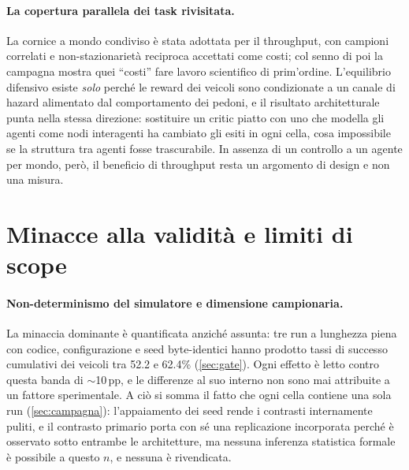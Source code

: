 \paragraph{La copertura parallela dei task rivisitata.}
La cornice a mondo condiviso è stata adottata per il throughput, con
campioni correlati e non-stazionarietà reciproca accettati come costi;
col senno di poi la campagna mostra quei ``costi'' fare lavoro
scientifico di prim'ordine. L'equilibrio difensivo esiste \emph{solo}
perché le reward dei veicoli sono condizionate a un canale di hazard
alimentato dal comportamento dei pedoni, e il risultato architetturale
punta nella stessa direzione: sostituire un critic piatto con uno che
modella gli agenti come nodi interagenti ha cambiato gli esiti in ogni
cella, cosa impossibile se la struttura tra agenti fosse trascurabile.
In assenza di un controllo a un agente per mondo, però, il beneficio di
throughput resta un argomento di design e non una misura.

\section{Minacce alla validità e limiti di scope}
\label{sec:minacce}

\paragraph{Non-determinismo del simulatore e dimensione campionaria.}
La minaccia dominante è quantificata anziché assunta: tre run a
lunghezza piena con codice, configurazione e seed byte-identici hanno
prodotto tassi di successo cumulativi dei veicoli tra 52.2 e 62.4\%
(\cref{sec:gate}). Ogni effetto è letto contro questa banda di
$\sim$10\,pp, e le differenze al suo interno non sono mai attribuite a
un fattore sperimentale. A ciò si somma il fatto che ogni cella contiene
una sola run (\cref{sec:campagna}): l'appaiamento dei seed rende i
contrasti internamente puliti, e il contrasto primario porta con sé una
replicazione incorporata perché è osservato sotto entrambe le
architetture, ma nessuna inferenza statistica formale è possibile a
questo $n$, e nessuna è rivendicata.

